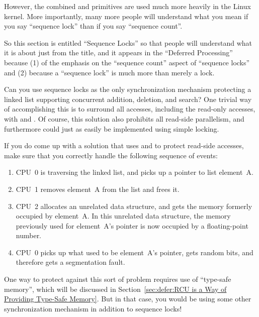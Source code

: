 \begin{enumerate}
	However, the combined  and
	 primitives are used much more heavily
	in the Linux kernel.
	More importantly, many more people will understand what you
	mean if you say ``sequence lock'' than if you say
	``sequence count''.

	So this section is entitled ``Sequence Locks'' so that people
	will understand what it is about just from the title, and
	it appears in the ``Deferred Processing'' because (1) of the
	emphasis on the ``sequence count'' aspect of ``sequence locks''
	and (2) because a ``sequence lock'' is much more than merely
	a lock.

\QuickQ{}
	Can you use sequence locks as the only synchronization
	mechanism protecting a linked list supporting concurrent
	addition, deletion, and search?
\QuickA{}
	One trivial way of accomplishing this is to surround all
	accesses, including the read-only accesses, with
	 and .
	Of course, this solution also prohibits all read-side
	parallelism, and furthermore could just as easily be implemented
	using simple locking.

	If you do come up with a solution that uses 
	and  to protect read-side accesses, make
	sure that you correctly handle the following sequence of events:

	\begin{enumerate}
	\item	CPU~0 is traversing the linked list, and picks up a pointer
		to list element~A.
	\item	CPU~1 removes element~A from the list and frees it.
	\item	CPU~2 allocates an unrelated data structure, and gets
		the memory formerly occupied by element~A.
		In this unrelated data structure, the memory previously
		used for element~A's  pointer is now occupied
		by a floating-point number.
	\item	CPU~0 picks up what used to be element~A's 
		pointer, gets random bits, and therefore gets a
		segmentation fault.
	\end{enumerate}

	One way to protect against this sort of problem requires use
	of ``type-safe memory'', which will be discussed in
	Section~\ref{sec:defer:RCU is a Way of Providing Type-Safe Memory}.
	But in that case, you would be using some other synchronization
	mechanism in addition to sequence locks!


\end{enumerate}

